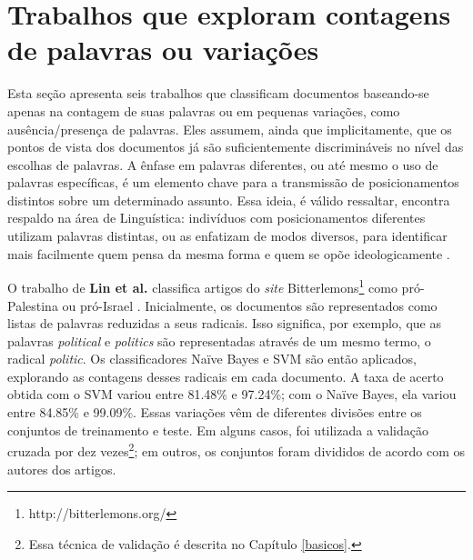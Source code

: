 

\section{Trabalhos que exploram contagens de palavras ou variações}
\label{contagem}

Esta seção apresenta seis trabalhos que classificam documentos baseando-se apenas na contagem de suas palavras ou em pequenas variações, como ausência/presença de palavras. Eles assumem, ainda que implicitamente, que os pontos de vista dos documentos já são suficientemente discrimináveis no nível das escolhas de palavras. A ênfase em palavras diferentes, ou até mesmo o uso de palavras específicas, é um elemento chave para a transmissão de posicionamentos distintos sobre um determinado assunto. Essa ideia, é válido ressaltar, encontra respaldo na área de Linguística: indivíduos com posicionamentos diferentes utilizam palavras distintas, ou as enfatizam de modos diversos, para identificar mais facilmente quem pensa da mesma forma e quem se opõe ideologicamente \cite{teubert}. %

O trabalho de \textbf{Lin et al.} classifica artigos do \emph{site} Bitterlemons\footnote{http://bitterlemons.org/} como pró-Palestina ou pró-Israel \cite{lin-et-al2006}. Inicialmente, os documentos são representados como listas de palavras reduzidas a seus radicais. Isso significa, por exemplo, que as palavras \emph{political} e \emph{politics} são representadas através de um mesmo termo, o radical \emph{politic}. Os classificadores Naïve Bayes e SVM são então aplicados, explorando as contagens desses radicais em cada documento. A taxa de acerto obtida com o SVM variou entre 81.48\% e 97.24\%; com o Naïve Bayes, ela variou entre 84.85\% e 99.09\%. Essas variações vêm de diferentes divisões entre os conjuntos de treinamento e teste. Em alguns casos, foi utilizada a validação cruzada por dez vezes\footnote{Essa técnica de validação é descrita no Capítulo \ref{basicos}.}; em outros, os conjuntos foram divididos de acordo com os autores dos artigos. 

